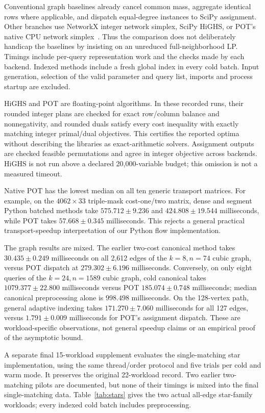 \documentclass[11pt]{article}
\theoremstyle{remark}
\begin{document}
Conventional graph baselines already cancel common mass, aggregate identical rows where applicable, and dispatch equal-degree instances to SciPy assignment. Other branches use NetworkX integer network simplex, SciPy HiGHS, or POT's native CPU network simplex~\cite{nxdoc,scipydoc,potdoc}. Thus the comparison does not deliberately handicap the baselines by insisting on an unreduced full-neighborhood LP. Timings include per-query representation work and the checks made by each backend. Indexed methods include a fresh global index in every cold batch. Input generation, selection of the valid parameter and query list, imports and process startup are excluded.

HiGHS and POT are floating-point algorithms. In these recorded runs, their rounded integer plans are checked for exact row/column balance and nonnegativity, and rounded duals satisfy every cost inequality with exactly matching integer primal/dual objectives. This certifies the reported optima without describing the libraries as exact-arithmetic solvers. Assignment outputs are checked feasible permutations and agree in integer objective across backends. HiGHS is not run above a declared 20,000-variable budget; this omission is not a measured timeout.

Native POT has the lowest median on all ten generic transport matrices. For example, on the $4062\times33$ triple-mask cost-one/two matrix, dense and segment Python batched methods take $575.712\pm9.236$ and $424.808\pm19.544$ milliseconds, while POT takes $57.668\pm0.345$ milliseconds. This rejects a general practical transport-speedup interpretation of our Python flow implementation.

The graph results are mixed. The earlier two-cost canonical method takes $30.435\pm0.249$ milliseconds on all 2,612 edges of the $k=8,n=74$ cubic graph, versus POT dispatch at $279.302\pm6.196$ milliseconds. Conversely, on only eight queries of the $k=24,n=1589$ cubic graph, cold canonical takes $1079.377\pm22.800$ milliseconds versus POT $185.074\pm0.748$ milliseconds; median canonical preprocessing alone is $998.498$ milliseconds. On the 128-vertex path, general adaptive indexing takes $171.270\pm7.060$ milliseconds for all 127 edges, versus $1.791\pm0.009$ milliseconds for POT's assignment dispatch. These are workload-specific observations, not general speedup claims or an empirical proof of the asymptotic bound.

A separate final 15-workload supplement evaluates the single-matching star implementation, using the same thread/order protocol and five trials per cold and warm mode. It preserves the original 22-workload record. Two earlier two-matching pilots are documented, but none of their timings is mixed into the final single-matching data. Table~\ref{tab:stars} gives the two actual all-edge star-family workloads; every indexed cold batch includes preprocessing.
\end{document}
